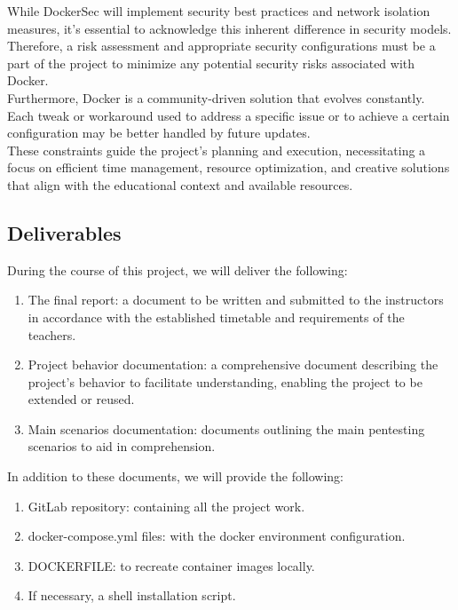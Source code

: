 \documentclass[a4paper,11pt,singlespacing]{article}
\begin{document}
While DockerSec will implement security best practices and network isolation measures, it's essential to acknowledge this inherent difference in security models. Therefore, a risk assessment and appropriate security configurations must be a part of the project to minimize any potential security risks associated with Docker.\\

Furthermore, Docker is a community-driven solution that evolves constantly. Each tweak or workaround used to address a specific issue or to achieve a certain configuration may be better handled by future updates.\\

These constraints guide the project's planning and execution, necessitating a focus on efficient time management, resource optimization, and creative solutions that align with the educational context and available resources.\par

\subsection{Deliverables}
During the course of this project, we will deliver the following:

\begin{enumerate}
    \item The final report: a document to be written and submitted to the instructors in accordance with the established timetable and requirements of the teachers.
    
    \item Project behavior documentation: a comprehensive document describing the project's behavior to facilitate understanding, enabling the project to be extended or reused.
    
    \item Main scenarios documentation: documents outlining the main pentesting scenarios to aid in comprehension.
\end{enumerate}

In addition to these documents, we will provide the following:

\begin{enumerate}
    \item GitLab repository: containing all the project work.
    
    \item docker-compose.yml files: with the docker environment configuration.
    
    \item DOCKERFILE: to recreate container images locally.
    
    \item If necessary, a shell installation script.
\end{enumerate}
\end{document}
